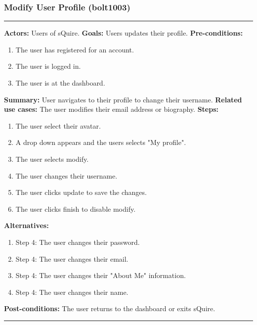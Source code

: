 \documentclass[11pt]{report}
\begin{document}
\subsubsection{Modify User Profile (bolt1003)}
\vspace{2pt}
\hrule
\vspace{8pt}
 \textbf{Actors:} Users of sQuire. \newline
\textbf{Goals:} Users updates their profile. \newline
 \textbf{Pre-conditions:} \begin{enumerate}
  \item The user has registered for an account.
  \item The user is logged in.
  \item The user is at the dashboard.
 \end{enumerate}
 \textbf{Summary:} User navigates to their profile to change their username.\newline
\textbf{Related use cases:} The user modifies their email address or biography. \newline
\textbf{Steps:} \begin{enumerate}
  \item The user select their avatar.
  \item A drop down appears and the users selects "My profile".
  \item The user selects modify.
  \item The user changes their username.
  \item The user clicks update to save the changes.
  \item The user clicks finish to disable modify.
 \end{enumerate}
 \textbf{Alternatives:} \begin{enumerate}
  \item Step 4: The user changes their password.
  \item Step 4: The user changes their email.
  \item Step 4: The user changes their "About Me" information.
  \item Step 4: The user changes their name.
 \end{enumerate}
 \textbf{Post-conditions:} The user returns to the dashboard or exits sQuire. \newline
\vspace{8pt}
\hrule
\newpage
\end{document}
